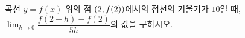 곡선 $y=f(x)$ 위의 점 $(2{,}\mkern3mu\mathopen{}f(2))$에서의 접선의 기울기가 $10$일 때, $\displaystyle\lim_{h\to 0}\dfrac{f(2+h)-f(2)}{5h}$의 값을 구하시오.
